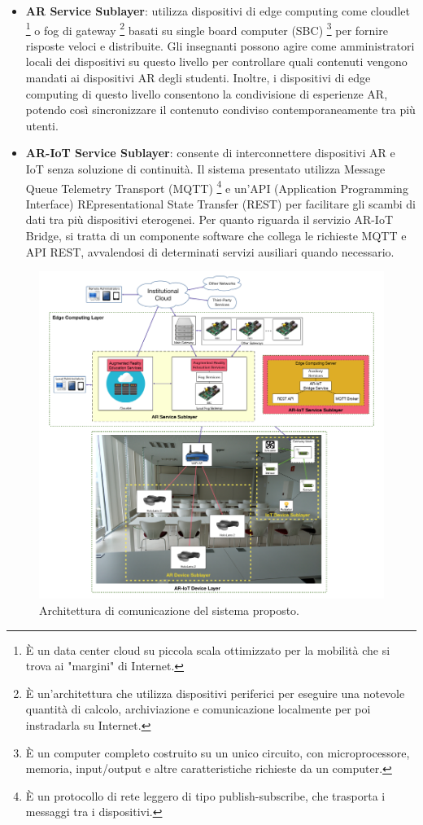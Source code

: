 \begin{itemize}
    \item \textbf{AR Service Sublayer}: utilizza dispositivi di edge computing come cloudlet \footnote{È un data center cloud su piccola scala ottimizzato per la mobilità che si trova ai "margini" di Internet.} o fog di gateway \footnote{È un'architettura che utilizza dispositivi periferici per eseguire una notevole quantità di calcolo, archiviazione e comunicazione localmente per poi instradarla su Internet.} basati su single board computer (SBC) \footnote{È un computer completo costruito su un unico circuito, con microprocessore, memoria, input/output e altre caratteristiche richieste da un computer. } per fornire risposte veloci e distribuite. Gli insegnanti possono agire come amministratori locali dei dispositivi su questo livello per controllare quali contenuti vengono mandati ai dispositivi AR degli studenti. Inoltre, i dispositivi di edge computing di questo livello consentono la condivisione di esperienze AR, potendo così sincronizzare il contenuto condiviso contemporaneamente tra più utenti.
    \item \textbf{AR-IoT Service Sublayer}: consente di interconnettere dispositivi AR e IoT senza soluzione di continuità. Il sistema presentato utilizza Message Queue Telemetry Transport (MQTT) \footnote{È un protocollo di rete leggero di tipo publish-subscribe, che trasporta i messaggi tra i dispositivi. } e un'API (Application Programming Interface) REpresentational State Transfer (REST) per facilitare gli scambi di dati tra più dispositivi eterogenei. Per quanto riguarda il servizio AR-IoT Bridge, si tratta di un componente software che collega le richieste MQTT e API REST, avvalendosi di determinati servizi ausiliari quando necessario.
\end{itemize}

\begin{figure}[t]
    \centering
    \includegraphics[width=\textwidth]{images/Communications-architecture.png}
    \caption{Architettura di comunicazione del sistema proposto.}
    \label{fig:figure32}
\end{figure}

